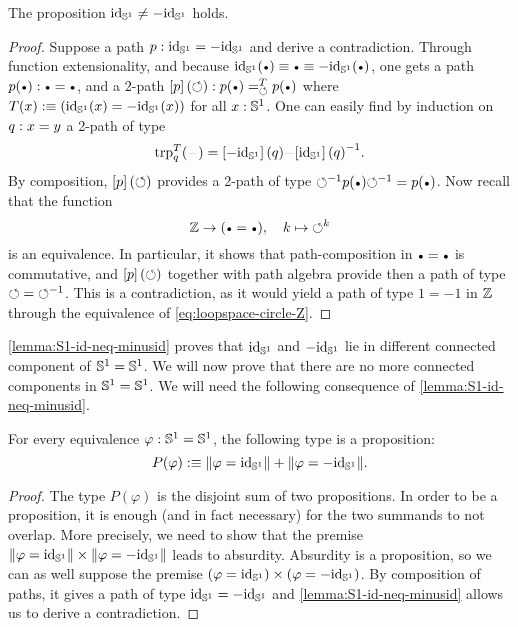\documentclass[english,a4]{article}
\renewcommand{\ap}[1]{\left[{#1}\right]}
\begin{document}
\begin{lemma}
  \label{lemma:S1-id-neq-minusid}%
  The proposition $\mathord{\mathrm{id}}_{{\mathbb S^{1}}} \neq -\mathord{\mathrm{id}}_{{\mathbb S^{1}}}$ holds.
\end{lemma}
\begin{proof}
  Suppose a path $p:\mathord{\mathrm{id}}_{{\mathbb S^{1}}} = -\mathord{\mathrm{id}}_{{\mathbb S^{1}}}$ and derive a
  contradiction. Through function extensionality, and because
  $\id_\Sc(\base) \jdeq \base \jdeq -\id_\Sc(\base)$, one gets a path
  $p(\base) \from \base = \base$, and a $2$-path
  $\ap p (\Sloop) \from \pathover {p(\base)} T \Sloop {p(\base)}$ where
  $T(x)\mathrel{\hbox{:}\mkern-5mu\equiv} (\mathord{\mathrm{id}}_{{\mathbb S^{1}}}(x) = -\mathord{\mathrm{id}}_{{\mathbb S^{1}}}(x))$ for all $x:{{\mathbb S^{1}}}$. One can
  easily find by induction on $q: x=y$ a 2-path of type
  \begin{displaymath}
    \trp [T] q (\blank) = \ap{-\id_\Sc}(q) \blank \inv{\ap{\id_\Sc}(q)}.
  \end{displaymath}
  By composition, $\ap p (\Sloop)$ provides a 2-path of type
  $\inv\Sloop p(\base) \inv\Sloop = p(\base)$. Now recall that
  the function
  \begin{equation}
    \label{eq:loopspace-circle-Z}%
    \ZZ\to(\base=\base),\quad k \mapsto \Sloop^k 
  \end{equation}
  is an equivalence. In particular, it shows that path-composition in
  $\base=\base$ is commutative, and $\ap p (\Sloop)$ together with
  path algebra provide then a path of type $\mathord{\circlearrowleft} = {\mathord{\circlearrowleft}}^{-1}$. This
  is a contradiction, as it would yield a path of type $1=-1$ in $\mathbb{Z}$
  through the equivalence of \cref{eq:loopspace-circle-Z}.
\end{proof}
\cref{lemma:S1-id-neq-minusid} proves that $\mathord{\mathrm{id}}_{{\mathbb S^{1}}}$ and $-\mathord{\mathrm{id}}_{{\mathbb S^{1}}}$
lie in different connected component of ${{\mathbb S^{1}}}={{\mathbb S^{1}}}$. We will now prove
that there are no more connected components in ${{\mathbb S^{1}}}={{\mathbb S^{1}}}$. We will need
the following consequence of \cref{lemma:S1-id-neq-minusid}.
\begin{corollary}%
  \label{cor:S1-eq-either-isaprop}%
  For every equivalence $\varphi: {{\mathbb S^{1}}}={{\mathbb S^{1}}}$, the following type is
  a proposition:
  \begin{equation}
    \label{eq:S1-def-target-eq}%
    P(\varphi) \defequi \Trunc{\varphi = \id_\Sc} + \Trunc{\varphi = -\id_\Sc}.
  \end{equation}
\end{corollary}
\begin{proof}
  The type $P(\varphi)$ is the disjoint sum of two propositions. In
  order to be a proposition, it is enough (and in fact necessary) for
  the two summands to not overlap. More precisely, we need to show
  that the premise
  $\lVert\varphi = \mathord{\mathrm{id}}_{{\mathbb S^{1}}}\rVert\times\lVert\varphi = -\mathord{\mathrm{id}}_{{\mathbb S^{1}}}\rVert$ leads to
  absurdity. Absurdity is a proposition, so we can as well suppose the
  premise ${(\varphi = \mathord{\mathrm{id}}_{{\mathbb S^{1}}})}\times{(\varphi = -\mathord{\mathrm{id}}_{{\mathbb S^{1}}})}$. By
  composition of paths, it gives a path of type $\mathord{\mathrm{id}}_{{\mathbb S^{1}}} = -\mathord{\mathrm{id}}_{{\mathbb S^{1}}}$
  and \cref{lemma:S1-id-neq-minusid} allows us to derive a
  contradiction.
\end{proof}
\end{document}
